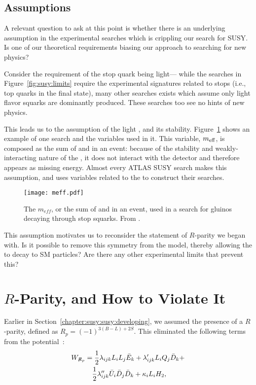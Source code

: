 \subsection{Assumptions}

A relevant question to ask at this point is whether there is an underlying assumption in the experimental searches which is crippling our search for SUSY. Is one of our theoretical requirements biasing our approach to searching for new physics?

Consider the requirement of the stop quark being light--- while the searches in Figure~\ref{fig:susy:limits} require the experimental signatures related to stops (i.e., top quarks in the final state), many other searches exists which assume only light flavor squarks are dominantly produced. These searches too see no hints of new physics.

This leads us to the assumption of the light \lsp, and its stability. Figure~\ref{fig:susy:meff} shows an example of one search and the variables used in it. This variable, $m_{\rm eff}$, is composed as the sum of \met and \Ht in an event: because of the stability and weakly-interacting nature of the \lsp, it does not interact with the detector and therefore appears as missing energy. Almost every ATLAS SUSY search makes this assumption, and uses variables related to the \met to construct their searches. 
 

\begin{figure}
\centering
\texttt{[image: meff.pdf]}
\label{fig:susy:meff}
\caption{The $m_{eff}$, or the sum of \met and \Ht in an event, used in a search for gluinos decaying through stop squarks. From \cite{Aad:2014lra}.}
\end{figure}


This assumption motivates us to reconsider the statement of $R$-parity we began with. Is it possible to remove this symmetry from the model, thereby allowing the \lsp to decay to SM particles? Are there any other experimental limits that prevent this? 

\section{$R$-Parity, and How to Violate It}
\label{chapter:susy:r}
Earlier in Section~\ref{chapter:susy:susy:developing}, we assumed the presence of a $R$-parity, defined as $R_p = (-1)^{3(B-L)+2S}$. This eliminated the following terms from the potential~\cite{dreinerRPV}:
%
  \begin{eqnarray} 
    W_{\not R_p} &= \frac{1}{2} \lambda_{ijk} L_{i}L_{j}\bar E_{k} + \lambda_{ijk}^{\prime} L_{i}Q_{j}\bar D_{k} +  \nonumber \\
       & \quad \frac{1}{2}\lambda_{ijk}^{\prime\prime}\bar U_{i}\bar D_{j}\bar D_{k} + \kappa_iL_{i}H_{2},
    \label{eqn:rpvandudd:wrpv}
  \end{eqnarray} 

